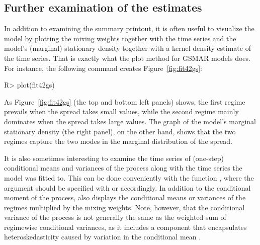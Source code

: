\documentclass[nojss]{jss} %
\begin{document}
\subsection{Further examination of the estimates}\label{sec:examestim}
In addition to examining the summary printout, it is often useful to visualize the model by plotting the mixing weights together with the time series and the model's (marginal) stationary density together with a kernel density estimate of the time series. That is exactly what the plot method for GSMAR models does. For instance, the following command creates Figure~\ref{fig:fit42gs}:
%
\begin{CodeChunk}
\begin{CodeInput}
R> plot(fit42gs)
\end{CodeInput}
\end{CodeChunk}
%
As Figure~\ref{fig:fit42gs} (the top and bottom left panels) shows, the first regime prevails when the spread takes small values, while the second regime mainly dominates when the spread takes large values. The graph of the model's marginal stationary density (the right panel), on the other hand, shows that the two regimes capture the two modes in the marginal distribution of the spread.

It is also sometimes interesting to examine the time series of (one-step) conditional means and variances of the process along with the time series the model was fitted to. This can be done conveniently with the function , where the argument  should be specified with  or  accordingly. In addition to the conditional moment of the process,  also displays the conditional means or variances of the regimes multiplied by the mixing weights. Note, however, that the conditional variance of the process is not generally the same as the weighted sum of regimewise conditional variances, as it includes a component that encapsulates heteroskedasticity caused by variation in the conditional mean \cite[see][Equation (2.19)]{Virolainen:2020}.
\end{document}
